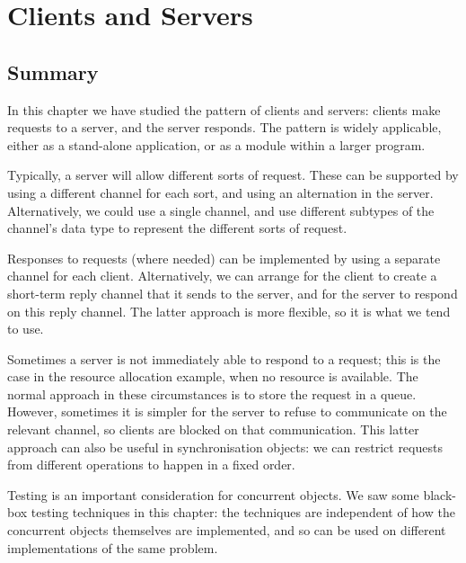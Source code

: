 \chapter{Clients and Servers}
\label{chap:clientServer}






\section{Summary}

In this chapter we have studied the pattern of clients and servers: clients
make requests to a server, and the server responds.  The pattern is widely
applicable, either as a stand-alone application, or as a module within a
larger program. 

Typically, a server will allow different sorts of request.  These can be
supported by using a different channel for each sort, and using an alternation
in the server.  Alternatively, we could use a single channel, and use
different subtypes of the channel's data type to represent the different sorts
of request. 

Responses to requests (where needed) can be implemented by using a separate
channel for each client.  Alternatively, we can arrange for the client to
create a short-term reply channel that it sends to the server, and for the
server to respond on this reply channel.  The latter approach is more
flexible, so it is what we tend to use.

Sometimes a server is not immediately able to respond to a request; this is
the case in the resource allocation example, when no resource is available.
The normal approach in these circumstances is to store the request in a queue.
However, sometimes it is simpler for the server to refuse to communicate on
the relevant channel, so clients are blocked on that communication.  This
latter approach can also be useful in synchronisation objects: we can restrict
requests from different operations to happen in a fixed order.

Testing is an important consideration for concurrent objects.  We saw some
black-box testing techniques in this chapter: the techniques are independent
of how the concurrent objects themselves are implemented, and so can be used
on different implementations of the same problem.

